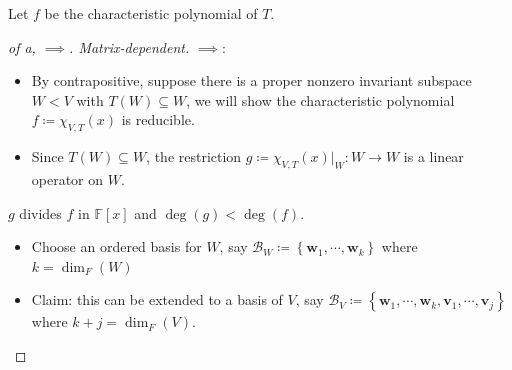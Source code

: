 \begin{solution}

\envlist

Let \(f\) be the characteristic polynomial of \(T\).

\begin{proof}[of a, $\implies$. Matrix-dependent]

\(\implies\):

\begin{itemize}
\tightlist
\item
  By contrapositive, suppose there is a proper nonzero invariant
  subspace \(W<V\) with \(T(W) \subseteq W\), we will show the
  characteristic polynomial \(f \coloneqq\chi_{V, T}(x)\) is reducible.
\item
  Since \(T(W)\subseteq W\), the restriction
  \(g\coloneqq\chi_{V, T}(x) \mathrel{\Big|}_W: W\to W\) is a linear
  operator on \(W\).
\end{itemize}

\begin{claim}

\(g\) divides \(f\) in \({\mathbb{F}}[x]\) and \(\deg(g) < \deg(f)\).

\end{claim}

\begin{itemize}
\item
  Choose an ordered basis for \(W\), say
  \({\mathcal{B}}_W \coloneqq\left\{{\mathbf{w}_1, \cdots, \mathbf{w}_k}\right\}\)
  where \(k=\dim_F(W)\)
\item
  Claim: this can be extended to a basis of \(V\), say
  \({\mathcal{B}}_V \coloneqq\left\{{\mathbf{w}_1, \cdots, \mathbf{w}_k, \mathbf{v}_1, \cdots, \mathbf{v}_j}\right\}\)
  where \(k+j = \dim_F(V)\).


\end{itemize}
\end{proof}
\end{solution}

